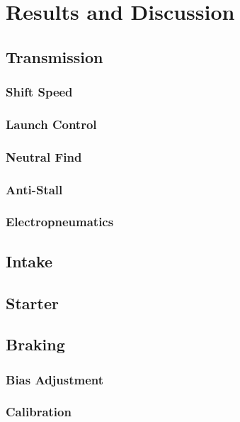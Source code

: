 \chapter{Results and Discussion}


\section{Transmission}


\subsection{Shift Speed}


\subsection{Launch Control}


\subsection{Neutral Find}


\subsection{Anti-Stall}


\subsection{Electropneumatics}


\section{Intake}


\section{Starter}


\section{Braking}


\subsection{Bias Adjustment}


\subsection{Calibration}


